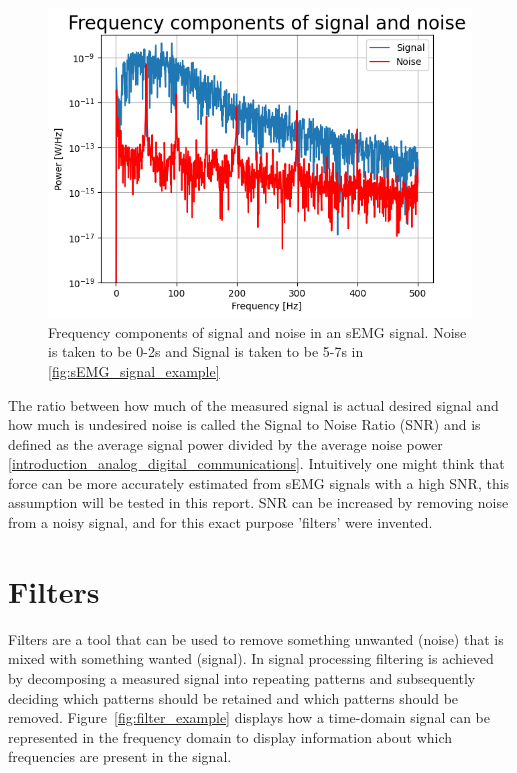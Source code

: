 \begin{figure}[h!t]
	\begin{center}
		\includegraphics[width=0.7\columnwidth]{images/sEMG_fft_signalnoise_example.png}
	\end{center}
	\caption{Frequency components of signal and noise in an sEMG signal. 
    Noise is taken to be 0-2s and Signal is taken to be 5-7s in \ref{fig:sEMG_signal_example}}
	\label{fig:sEMG_fft_signalnoise_example}
\end{figure}

The ratio between how much of the measured signal is actual desired signal and how much is undesired noise is called the Signal to Noise Ratio (SNR) and is defined as the average signal power divided by the average noise power \ref{introduction_analog_digital_communications}. Intuitively one might think that force can be more accurately estimated from sEMG signals with a high SNR, this assumption will be tested in this report. SNR can be increased by removing noise from a noisy signal, and for this exact purpose 'filters' were invented.

\section{Filters}
Filters are a tool that can be used to remove something unwanted (noise) that is mixed with something wanted (signal). In signal processing filtering is achieved by decomposing a measured signal into repeating patterns and subsequently deciding which patterns should be retained and which patterns should be removed. Figure~\ref{fig:filter_example} displays how a time-domain signal can be represented in the frequency domain to display information about which frequencies are present in the signal.

